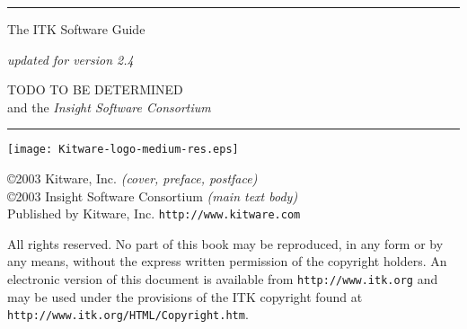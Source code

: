 
\begin{minipage}[t][3cm][b]{\textwidth}
\rule{14cm}{1pt}
\end{minipage}


\begin{minipage}[t][3cm][b]{\textwidth}
\Huge
The ITK Software Guide\\
\normalsize
\par
\emph{updated for version 2.4}\\
\end{minipage}

\hfill
\begin{minipage}[t][6cm][b]{0.6\textwidth}
\Large
\renewcommand{\baselinestretch}{1.5}
TODO TO BE DETERMINED \\
and the \emph{Insight Software Consortium}
\normalsize
\end{minipage}


\begin{minipage}[t][2cm][b]{\textwidth}
\rule{14cm}{1pt}
\end{minipage}

\newpage

\begin{minipage}[t][4cm][b]{\textwidth}
\begin{center}
\texttt{[image: Kitware-logo-medium-res.eps]}
\end{center}
\par
\begin{center}
\large
\copyright 2003 Kitware, Inc. \emph{(cover, preface, postface)}\\
\copyright 2003 Insight Software Consortium \emph{(main text body)}\\
Published by Kitware, Inc. \texttt{http://www.kitware.com}
\normalsize
\end{center}
\end{minipage}


\begin{minipage}[t][2.25cm][b]{\textwidth}
\begin{center}
All rights reserved. No part of this book may be reproduced, in any form 
or by any means, without the express written permission of the copyright
holders. An electronic version of this document is available from
\texttt{http://www.itk.org} and may be used under the provisions of the
ITK copyright found at \texttt{http://www.itk.org/HTML/Copyright.htm}.
\end{center}
\end{minipage}


